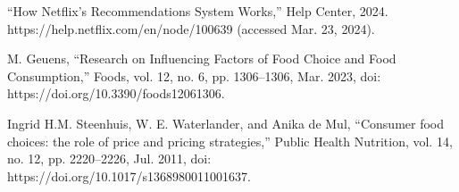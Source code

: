 \documentclass{report}
\begin{document}
\begin{thebibliography}{}
     “How Netflix’s Recommendations System Works,” Help Center, 2024. https://help.netflix.com/en/node/100639 (accessed Mar. 23, 2024).

     M. Geuens, “Research on Influencing Factors of Food Choice and Food Consumption,” Foods, vol. 12, no. 6, pp. 1306–1306, Mar. 2023, doi: https://doi.org/10.3390/foods12061306.

     Ingrid H.M. Steenhuis, W. E. Waterlander, and Anika de Mul, “Consumer food choices: the role of price and pricing strategies,” Public Health Nutrition, vol. 14, no. 12, pp. 2220–2226, Jul. 2011, doi: https://doi.org/10.1017/s1368980011001637.
    ‌
    ‌
    ‌
    ‌
    ‌
    ‌
    ‌
    ‌
    ‌
    ‌







    

\end{thebibliography}
\end{document}
